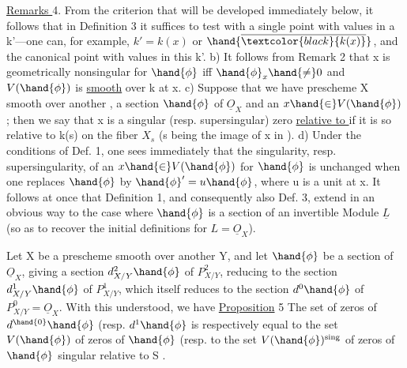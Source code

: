 
\uline{Remarks }4.  From the  criterion that will be developed immediately below, it follows
that in Definition 3 it suffices to test with a single point
with values in a k'---one can, for example,  $k'=k(x)$ or $\hand{\overline{\textcolor{black}{k(x)}}}$, and
the canonical point with values in this k'. b) It follows from Remark
2 that x is geometrically nonsingular for $\hand{\phi}$ iff $\hand{\phi}_x \hand{\neq} 0$ and
$V(\hand{\phi})$ is \uline{smooth} over k at x. c) Suppose that we have  prescheme X smooth
over another , a section $\hand{\phi}$ of $\underline{O}_X$ and an $x \hand{\in} V(\hand{\phi})$; then we say that x
is a singular (resp. supersingular) zero \uline{relative to } if it is so
relative to k(s) on the fiber $X_s$ (s being the image of x in ). d) Under
the conditions of Def. 1, one sees immediately that the singularity, resp.
 supersingularity, of an $x \hand{\in} V(\hand{\phi})$ for $\hand{\phi}$ is unchanged when one
replaces $\hand{\phi}$ by $\hand{\phi}'=u\hand{\phi}$, where u is a unit at x. It follows at once that
 Definition 1, and consequently also Def. 3, extend in an
obvious way to the case where $\hand{\phi}$ is a section of an invertible Module $\underline{L}$ (so as
to recover the initial definitions for $L = \underline{O}_X$).

 Let X be a prescheme smooth over
another Y, and let $\hand{\phi}$ be a section of $\underline{O}_X$, giving a section $d^2_{X/Y}\hand{\phi}$ of
$P^2_{X/Y}$, reducing to the section $d^1_{X/Y}\hand{\phi}$ of $P^1_{X/Y}$, which itself
reduces to the section $d^0\hand{\phi}$  of $P^0_{X/Y} = \underline{O}_X$. With this understood, we have
\uline{Proposition} 5 The set of zeros of $d^{\hand{0}}\hand{\phi}$ (resp. $d^1\hand{\phi}$ \hand{)} 
 is respectively equal to the set $V(\hand{\phi})$ of zeros of $\hand{\phi}$ (resp. to
the set $V(\hand{\phi})^{\mathrm{sing}}$ of zeros of $\hand{\phi}$ singular relative to S\hand{)} 
.

